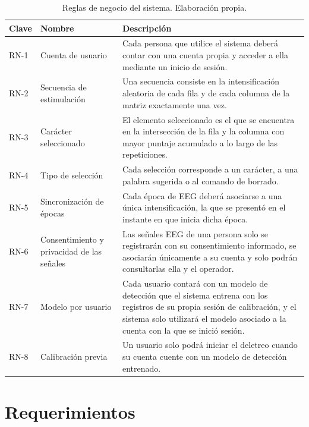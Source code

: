 \begin{table}[H]
\centering
\small
\begin{tabularx}{\textwidth}{|L{1.4cm}|L{3.6cm}|Y|}
\hline
\textbf{Clave} & \textbf{Nombre} & \textbf{Descripción} \\
\hline
RN-1 & Cuenta de usuario & Cada persona que utilice el sistema deberá contar con una cuenta propia y acceder a ella mediante un inicio de sesión. \\
\hline
RN-2 & Secuencia de estimulación & Una secuencia consiste en la intensificación aleatoria de cada fila y de cada columna de la matriz exactamente una vez. \\
\hline
RN-3 & Carácter seleccionado & El elemento seleccionado es el que se encuentra en la intersección de la fila y la columna con mayor puntaje acumulado a lo largo de las repeticiones. \\
\hline
RN-4 & Tipo de selección & Cada selección corresponde a un carácter, a una palabra sugerida o al comando de borrado. \\
\hline
RN-5 & Sincronización de épocas & Cada época de EEG deberá asociarse a una única intensificación, la que se presentó en el instante en que inicia dicha época. \\
\hline
RN-6 & Consentimiento y privacidad de las señales & Las señales EEG de una persona solo se registrarán con su consentimiento informado, se asociarán únicamente a su cuenta y solo podrán consultarlas ella y el operador. \\
\hline
RN-7 & Modelo por usuario & Cada usuario contará con un modelo de detección que el sistema entrena con los registros de su propia sesión de calibración, y el sistema solo utilizará el modelo asociado a la cuenta con la que se inició sesión. \\
\hline
RN-8 & Calibración previa & Un usuario solo podrá iniciar el deletreo cuando su cuenta cuente con un modelo de detección entrenado. \\
\hline
\end{tabularx}
\caption{Reglas de negocio del sistema. Elaboración propia.}
\label{tab:reglas}
\end{table}

\section[REQUERIMIENTOS]{Requerimientos}


